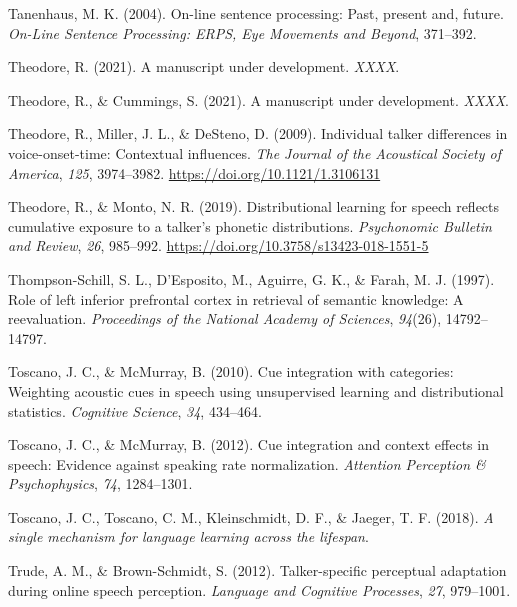 \documentclass[
  11pt,
  english,
  man,floatsintext]{apa6}
\newlength{\cslhangindent}
\newlength{\cslentryspacingunit} %
\newenvironment{CSLReferences}[2] %
 {%
  \setlength{\parindent}{0pt}
  \ifodd #1
  \let\oldpar\par
  \def\par{\hangindent=\cslhangindent\oldpar}
  \fi
  \setlength{\parskip}{#2\cslentryspacingunit}
 }%
 {}
\begin{document}
\begin{CSLReferences}{1}{0}
\leavevmode{}%
Tanenhaus, M. K. (2004). On-line sentence processing: Past, present and, future. \emph{On-Line Sentence Processing: ERPS, Eye Movements and Beyond}, 371--392.

\leavevmode{}%
Theodore, R. (2021). A manuscript under development. \emph{XXXX}.

\leavevmode{}%
Theodore, R., \& Cummings, S. (2021). A manuscript under development. \emph{XXXX}.

\leavevmode{}%
Theodore, R., Miller, J. L., \& DeSteno, D. (2009). Individual talker differences in voice-onset-time: Contextual influences. \emph{The Journal of the Acoustical Society of America}, \emph{125}, 3974--3982. \url{https://doi.org/10.1121/1.3106131}

\leavevmode{}%
Theodore, R., \& Monto, N. R. (2019). Distributional learning for speech reflects cumulative exposure to a talker's phonetic distributions. \emph{Psychonomic Bulletin and Review}, \emph{26}, 985--992. \url{https://doi.org/10.3758/s13423-018-1551-5}

\leavevmode{}%
Thompson-Schill, S. L., D'Esposito, M., Aguirre, G. K., \& Farah, M. J. (1997). Role of left inferior prefrontal cortex in retrieval of semantic knowledge: A reevaluation. \emph{Proceedings of the National Academy of Sciences}, \emph{94}(26), 14792--14797.

\leavevmode{}%
Toscano, J. C., \& McMurray, B. (2010). Cue integration with categories: Weighting acoustic cues in speech using unsupervised learning and distributional statistics. \emph{Cognitive Science}, \emph{34}, 434--464.

\leavevmode{}%
Toscano, J. C., \& McMurray, B. (2012). Cue integration and context effects in speech: Evidence against speaking rate normalization. \emph{Attention Perception \& Psychophysics}, \emph{74}, 1284--1301.

\leavevmode{}%
Toscano, J. C., Toscano, C. M., Kleinschmidt, D. F., \& Jaeger, T. F. (2018). \emph{A single mechanism for language learning across the lifespan}.

\leavevmode{}%
Trude, A. M., \& Brown-Schmidt, S. (2012). Talker-specific perceptual adaptation during online speech perception. \emph{Language and Cognitive Processes}, \emph{27}, 979--1001.


\end{CSLReferences}
\end{document}
